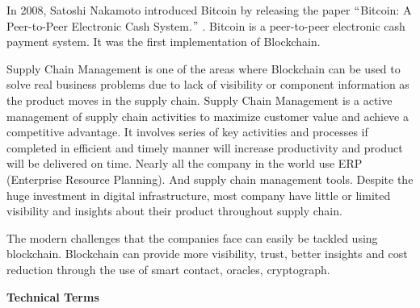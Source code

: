 \documentclass[12pt]{article}
\begin{document}
{\fontsize{14pt}{16.8pt}\selectfont In 2008, Satoshi Nakamoto introduced Bitcoin by releasing the paper $``$Bitcoin: A Peer-to-Peer Electronic Cash System.$"$ . Bitcoin is a peer-to-peer electronic cash payment system. It was the first implementation of Blockchain. \par}\par

{\fontsize{14pt}{16.8pt}\selectfont Supply Chain Management is one of the areas where Blockchain can be used to solve real business problems due to lack of visibility or component information as the product moves in the supply chain. Supply Chain Management is a active management of supply chain activities to maximize customer value and achieve a competitive advantage. It involves series of key activities and processes if completed in efficient and timely manner will increase productivity and product will be delivered on time. Nearly all the company in the world use ERP (Enterprise Resource Planning). And supply chain management tools. Despite the huge investment in digital infrastructure, most company have little or limited visibility and insights about their product throughout supply chain.\par}\par

{\fontsize{14pt}{16.8pt}\selectfont The modern challenges that the companies face can easily be tackled using blockchain. Blockchain can provide more visibility, trust, better insights and cost reduction through the use of smart contact, oracles, cryptograph.\par}\par


{\fontsize{14pt}{16.8pt}\selectfont \textbf{Technical Terms}\par}\par



\end{document}

